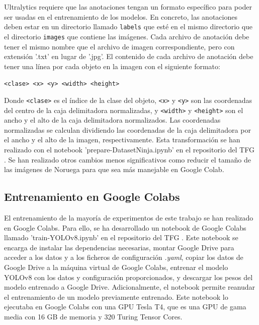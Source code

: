 Ultralytics requiere que las anotaciones tengan un formato específico para poder ser usadas en el entrenamiento de los modelos. En concreto, las anotaciones deben estar en un directorio llamado \texttt{labels} que esté en el mismo directorio que el directorio \texttt{images} que contiene las imágenes. Cada archivo de anotación debe tener el mismo nombre que el archivo de imagen correspondiente, pero con extensión '.txt' en lugar de '.jpg'. El contenido de cada archivo de anotación debe tener una línea por cada objeto en la imagen con el siguiente formato:
\begin{center}
    \texttt{<clase> <x> <y> <width> <height>}
\end{center}
Donde \texttt{<clase>} es el índice de la clase del objeto, \texttt{<x>} y \texttt{<y>} son las coordenadas del centro de la caja delimitadora normalizadas, y \texttt{<width>} y \texttt{<height>} son el ancho y el alto de la caja delimitadora normalizados. Las coordenadas normalizadas se calculan dividiendo las coordenadas de la caja delimitadora por el ancho y el alto de la imagen, respectivamente. Esta transformación se han realizado con el notebook 'prepare-DatasetNinja.ipynb' en el repositorio del TFG \cite{TFG_Repository}. Se han realizado otros cambios menos significativos como reducir el tamaño de las imágenes de Noruega para que sea más manejable en Google Colab.

\subsection{Entrenamiento en Google Colabs}
El entrenamiento de la mayoría de experimentos de este trabajo se han realizado en Google Colabs. Para ello, se ha desarrollado un notebook de Google Colabs llamado 'train-YOLOv8.ipynb' en el repositorio del TFG \cite{TFG_Repository}. Este notebook se encarga de instalar las dependencias necesarias, montar Google Drive para acceder a los datos y a los ficheros de configuración \textit{.yaml}, copiar los datos de Google Drive a la máquina virtual de Google Colabs, entrenar el modelo YOLOv8 con los datos y configuración proporcionados, y descargar los pesos del modelo entrenado a Google Drive. Adicionalmente, el notebook permite reanudar el entrenamiento de un modelo previamente entrenado. Este notebook lo ejecutaba en Google Colabs con una GPU Tesla T4, que es una GPU de gama media con 16 GB de memoria y 320 Turing Tensor Cores.

